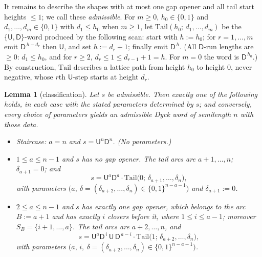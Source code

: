 \documentclass[11pt]{article}
\newtheorem{lemma}[theorem]{Lemma}
\theoremstyle{definition}
\theoremstyle{remark}
\newcommand{\sU}{\mathsf{U}}
\newcommand{\sD}{\mathsf{D}}
\begin{document}
It remains to describe the shapes with at most one gap opener and all tail
start heights $\le1$; we call these \emph{admissible}. For $m\ge0$,
$h_0\in\{0,1\}$ and $d_1,\dots,d_m\in\{0,1\}$ with $d_1\le h_0$ when
$m\ge1$, let $\mathrm{Tail}(h_0;\,d_1,\dots,d_m)$ be the $\{\sU,\sD\}$-word
produced by the following scan: start with $h:=h_0$; for $r=1,\dots,m$ emit
$\sD^{\,h-d_r}$ then $\sU$, and set $h:=d_r+1$; finally emit $\sD^{\,h}$.
(All $\sD$-run lengths are $\ge0$: $d_1\le h_0$, and for $r\ge2$,
$d_r\le1\le d_{r-1}+1=h$. For $m=0$ the word is $\sD^{\,h_0}$.) By
construction, $\mathrm{Tail}$ describes a lattice path from height $h_0$ to
height $0$, never negative, whose $r$th $\sU$-step starts at height $d_r$.

\begin{lemma}[classification]\label{lem:classification}
Let $s$ be admissible. Then exactly one of the following holds, in each case
with the stated parameters determined by $s$; and conversely, every choice
of parameters yields an admissible Dyck word of semilength $n$ with those
data.
\begin{itemize}
\item[(S)] \emph{Staircase}: $a=n$ and $s=\sU^n\sD^n$. (No parameters.)
\item[(I)] $1\le a\le n-1$ and $s$ has no gap opener. The tail arcs are
  $a+1,\dots,n$; $\delta_{a+1}=0$; and
  \[
    s=\sU^a\sD^a\cdot\mathrm{Tail}\bigl(0;\,\delta_{a+1},\dots,\delta_n\bigr),
  \]
  with parameters $\bigl(a,\ \delta=(\delta_{a+2},\dots,\delta_n)\in\{0,1\}^{n-a-1}\bigr)$
  and $\delta_{a+1}:=0$.
\item[(II)] $2\le a\le n-1$ and $s$ has exactly one gap opener, which
  belongs to the arc $B:=a+1$ and has exactly $i$ closers before it, where
  $1\le i\le a-1$; moreover $S_B=\{i+1,\dots,a\}$. The tail arcs are
  $a+2,\dots,n$, and
  \[
    s=\sU^a\sD^{\,i}\,\sU\,\sD^{\,a-i}\cdot
      \mathrm{Tail}\bigl(1;\,\delta_{a+2},\dots,\delta_n\bigr),
  \]
  with parameters $\bigl(a,\,i,\ \delta=(\delta_{a+2},\dots,\delta_n)\in\{0,1\}^{n-a-1}\bigr)$.
\end{itemize}
\end{lemma}
\end{document}
